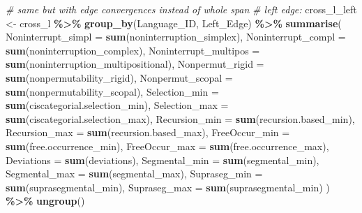 \documentclass[
]{article}
\newenvironment{Shaded}{\begin{snugshade}}{\end{snugshade}}
\newcommand{\AttributeTok}[1]{\textcolor[rgb]{0.13,0.29,0.53}{#1}}
\newcommand{\CommentTok}[1]{\textcolor[rgb]{0.56,0.35,0.01}{\textit{#1}}}
\newcommand{\FunctionTok}[1]{\textcolor[rgb]{0.13,0.29,0.53}{\textbf{#1}}}
\newcommand{\NormalTok}[1]{#1}
\newcommand{\OtherTok}[1]{\textcolor[rgb]{0.56,0.35,0.01}{#1}}
\newcommand{\SpecialCharTok}[1]{\textcolor[rgb]{0.81,0.36,0.00}{\textbf{#1}}}
\begin{document}
\begin{Shaded}
\begin{Highlighting}[]
\CommentTok{\# same but with edge convergences instead of whole span}
\CommentTok{\# left edge:}
\NormalTok{cross\_l\_left }\OtherTok{\textless{}{-}}\NormalTok{ cross\_l }\SpecialCharTok{\%\textgreater{}\%}
  \FunctionTok{group\_by}\NormalTok{(Language\_ID, Left\_Edge) }\SpecialCharTok{\%\textgreater{}\%}
  \FunctionTok{summarise}\NormalTok{(}
    \AttributeTok{Noninterrupt\_simpl =} \FunctionTok{sum}\NormalTok{(noninterruption\_simplex),}
    \AttributeTok{Noninterrupt\_compl =} \FunctionTok{sum}\NormalTok{(noninterruption\_complex),}
    \AttributeTok{Noninterrupt\_multipos =} \FunctionTok{sum}\NormalTok{(noninterruption\_multipositional),}
    \AttributeTok{Nonpermut\_rigid =} \FunctionTok{sum}\NormalTok{(nonpermutability\_rigid),}
    \AttributeTok{Nonpermut\_scopal =} \FunctionTok{sum}\NormalTok{(nonpermutability\_scopal),}
    \AttributeTok{Selection\_min =} \FunctionTok{sum}\NormalTok{(ciscategorial.selection\_min),}
    \AttributeTok{Selection\_max =} \FunctionTok{sum}\NormalTok{(ciscategorial.selection\_max),}
    \AttributeTok{Recursion\_min =} \FunctionTok{sum}\NormalTok{(recursion.based\_min),}
    \AttributeTok{Recursion\_max =} \FunctionTok{sum}\NormalTok{(recursion.based\_max),}
    \AttributeTok{FreeOccur\_min =} \FunctionTok{sum}\NormalTok{(free.occurrence\_min),}
    \AttributeTok{FreeOccur\_max =} \FunctionTok{sum}\NormalTok{(free.occurrence\_max),}
    \AttributeTok{Deviations =} \FunctionTok{sum}\NormalTok{(deviations),}
    \AttributeTok{Segmental\_min =} \FunctionTok{sum}\NormalTok{(segmental\_min),}
    \AttributeTok{Segmental\_max =} \FunctionTok{sum}\NormalTok{(segmental\_max),}
    \AttributeTok{Supraseg\_min =} \FunctionTok{sum}\NormalTok{(suprasegmental\_min),}
    \AttributeTok{Supraseg\_max =} \FunctionTok{sum}\NormalTok{(suprasegmental\_min)}
\NormalTok{  ) }\SpecialCharTok{\%\textgreater{}\%}
  \FunctionTok{ungroup}\NormalTok{()}


\end{Highlighting}
\end{Shaded}
\end{document}
